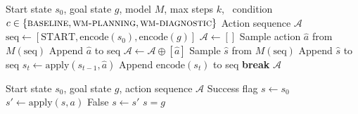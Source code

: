 %
%
%
%

\begin{algorithm}[t]
\caption{Autoregressive Solution Generation}
\label{alg:generate_solution}
\begin{algorithmic}[1]
\Require Start state $s_0$, goal state $g$, model $M$, max steps $k$,
\Statex \hspace{\algorithmicrequire}\ condition $c \in \{\textsc{baseline}, \textsc{wm-planning}, \textsc{wm-diagnostic}\}$
\Ensure Action sequence $\mathcal{A}$
\State $\text{seq} \gets [\text{START}, \text{encode}(s_0), \text{encode}(g)]$
\State $\mathcal{A} \gets []$
    \State Sample action $\hat{a}$ from $M(\text{seq})$ 
    \State Append $\hat{a}$ to seq
    \State $\mathcal{A} \gets \mathcal{A} \oplus [\hat{a}]$
        \State Sample $\hat{s}$ from $M(\text{seq})$ 
        \State Append $\hat{s}$ to seq 
        \State $s_t \gets \text{apply}(s_{t-1}, \hat{a})$ 
        \State Append $\text{encode}(s_t)$ to seq 
    \EndIf
     \textbf{break} 
    \EndIf
\EndFor
\State \Return $\mathcal{A}$
\end{algorithmic}
\end{algorithm}

\bigskip


\begin{algorithm}[t]
\caption{Plan Validator}
\label{alg:plan_validator}
\begin{algorithmic}[1]
\Require Start state $s_0$, goal state $g$, action sequence $\mathcal{A}$
\Ensure Success flag
\State $s \gets s_0$
    \State $s' \gets \text{apply}(s, a)$ 
     \Return False 
    \EndIf
    \State $s \gets s'$
\EndFor
\State \Return $s = g$
\end{algorithmic}
\end{algorithm}
